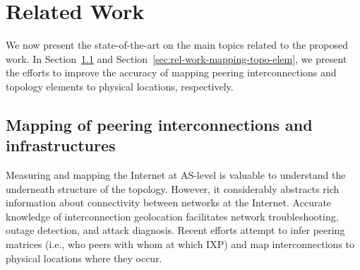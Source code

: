 \chapter{Related Work}\label{cap:related-work}
\thispagestyle{empty}

	We now present the state-of-the-art on the main topics related to the proposed work. 
	In Section~\ref{sec:rel-work-mapping-peer} and Section~\ref{sec:rel-work-mapping-topo-elem}, we present the efforts to improve the accuracy of mapping peering interconnections and topology elements to physical locations, respectively.



	\section{Mapping of peering interconnections and infrastructures}
	\label{sec:rel-work-mapping-peer}

	Measuring and mapping the Internet at AS-level is valuable to understand the underneath structure of the topology. However, it considerably abstracts rich information about connectivity between networks at the Internet. Accurate knowledge of interconnection geolocation facilitates network troubleshooting, outage detection, and attack diagnosis. Recent efforts attempt to infer peering matrices (i.e., who peers with whom at which IXP) and map interconnections to physical locations where they occur. 

